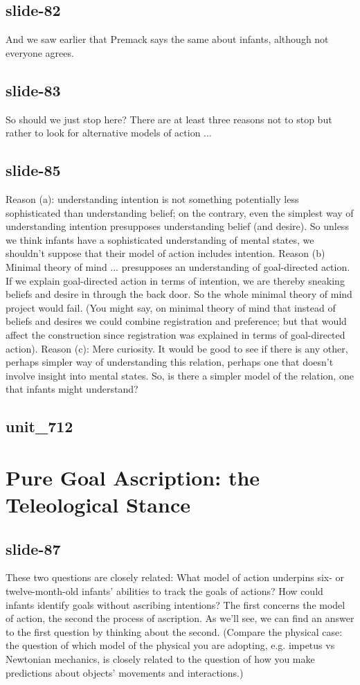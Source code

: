 \documentclass[12pt,\papersize]{extarticle}
\begin{document}
 
\subsection{slide-82}
And we saw earlier that Premack says the same about infants, although not everyone agrees.
 
 
\subsection{slide-83}
So should we just stop here? There are at least three reasons not to stop but rather to look for alternative models of action ...
 
 
\subsection{slide-85}
Reason (a): understanding intention is not something potentially less sophisticated than understanding belief; on the contrary, even the simplest way of understanding intention presupposes understanding belief (and desire). So unless we think infants have a sophisticated understanding of mental states, we shouldn't suppose that their model of action includes intention.
Reason (b) Minimal theory of mind ... presupposes an understanding of goal-directed action. If we explain goal-directed action in terms of intention, we are thereby sneaking beliefs and desire in through the back door. So the whole minimal theory of mind project would fail. (You might say, on minimal theory of mind that instead of beliefs and desires we could combine registration and preference; but that would affect the construction since registration was explained in terms of goal-directed action).
Reason (c): Mere curiosity. It would be good to see if there is any other, perhaps simpler way of understanding this relation, perhaps one that doesn't involve insight into mental states.
So, is there a simpler model of the relation, one that infants might understand?
 
 
\subsection{unit\_712}
 
\section{Pure Goal Ascription: the Teleological Stance}
 
 
\subsection{slide-87}
These two questions are closely related:
What model of action underpins six- or twelve-month-old infants’ abilities to track the goals of actions?
How could infants identify goals without ascribing intentions?
The first concerns the model of action, the second the process of ascription. As we'll see, we can find an answer to the first question by thinking about the second. (Compare the physical case: the question of which model of the physical you are adopting, e.g. impetus vs Newtonian mechanics, is closely related to the question of how you make predictions about objects' movements and interactions.)
 
\end{document}
